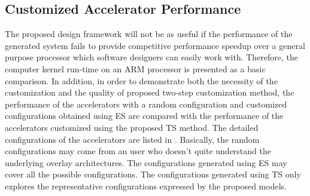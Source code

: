 \subsection{Customized Accelerator Performance}
The proposed design framework will not be as useful if the performance of the generated system fails to provide competitive performance speedup over a general purpose processor which software designers can easily work with. Therefore, the computer kernel run-time on an ARM processor is presented as a basic comparison. In addition, in order to demonstrate both the necessity of the customization and the quality of proposed two-step customization method, the performance of the accelerators with a random configuration and customized configurations obtained using ES are compared with the performance of the accelerators customized using the proposed TS method. The detailed configurations of the accelerators are listed in . Basically, the random configurations may come from an user who doesn't quite understand the underlying overlay architectures. The configurations generated using ES may cover all the possible configurations. The configurations generated using TS only explores the representative configurations expressed by the proposed models.

